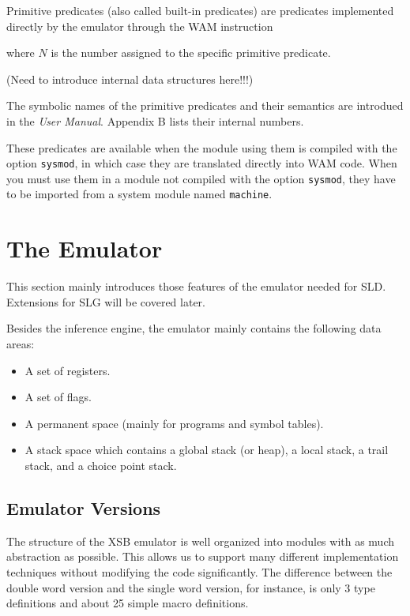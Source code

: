 \documentclass[11pt]{article}
\newcommand{\demo}[1]{\hspace*{1.5cm}{\sf #1}}
\begin{document}
Primitive predicates (also called built-in predicates)
are predicates implemented directly by the emulator through the
WAM instruction 

\demo{		builtin(N)			}

where $N$ is the number assigned to the specific primitive predicate.

(Need to introduce internal data structures here!!!)

The symbolic names of the primitive predicates and their semantics
are introdued in the {\it User Manual}. Appendix B lists
their internal numbers.

These predicates are available when the module using them is compiled
with the option {\tt sysmod}, in which case they are translated
directly into WAM code. When you must use them in a module not compiled
with the option {\tt sysmod}, they have to be imported from a system 
module named {\tt machine}.




\section                 {The Emulator}

This section mainly introduces those features of the emulator needed for
SLD.  Extensions for SLG will be covered later.

Besides the inference engine, the emulator mainly contains the following
data areas:

\begin{itemize}
  \item  A set of registers.
  \item  A set of flags.
  \item  A permanent space (mainly for programs and symbol tables).
  \item  A stack space which contains a global stack (or heap), a local stack,
     a trail stack, and a choice point stack.
\end{itemize}

\subsection{Emulator Versions}

The structure of the XSB emulator is well organized into 
modules with as much abstraction as possible. This allows us to support
many different implementation techniques without modifying the code
significantly. The difference between the double word version
and the single word version, for instance, is only 3 type definitions
and about 25 simple macro definitions.
\end{document}
